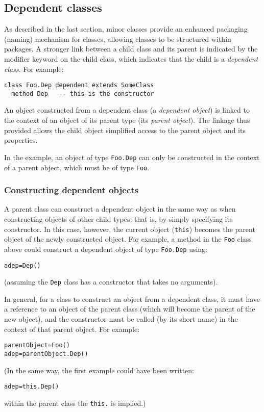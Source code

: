 \subsection{Dependent classes}\label{refsdepen}
\index{,}
\index{,}
\index{,}
 
As described in the last section, minor classes provide an enhanced
packaging (naming) mechanism for classes, allowing classes to be
structured within packages.  A stronger link between a child class and
its parent is indicated by the modifier keyword  on the
child class, which indicates that the child is a \emph{dependent class}.
For example:
\begin{lstlisting}
class Foo.Dep dependent extends SomeClass
  method Dep   -- this is the constructor
\end{lstlisting}
 
An object constructed from a dependent class (a \emph{dependent
object}) is linked to the context of an object of its parent
type (its \emph{parent object}).
The linkage thus provided allows the child object simplified access to
the parent object and its properties.
 
In the example, an object of type \texttt{Foo.Dep} can only be constructed
in the context of a parent object, which must be of type \texttt{Foo}.
\subsubsection{Constructing dependent objects}
 
A parent class can construct a dependent object in the same way as when
constructing objects of other child types; that is, by simply specifying
its constructor.  In this case, however, the current object
(\texttt{this}) becomes the parent object of the newly constructed object.
For example, a method in the \texttt{Foo} class above could construct a
dependent object of type \texttt{Foo.Dep} using:
\begin{lstlisting}
adep=Dep()
\end{lstlisting}
(assuming the \texttt{Dep} class has a constructor that takes no
arguments).
 
In general, for a class to construct an object from a dependent class,
it must have a reference to an object of the parent class (which will
become the parent of the new object), and the constructor must be called
(by its short name) in the context of that parent object.  For example:
\begin{lstlisting}
parentObject=Foo()
adep=parentObject.Dep()
\end{lstlisting}
(In the same way, the first example could have been written:
\begin{lstlisting}
adep=this.Dep()
\end{lstlisting}
within the parent class the \texttt{this.} is implied.)
 
